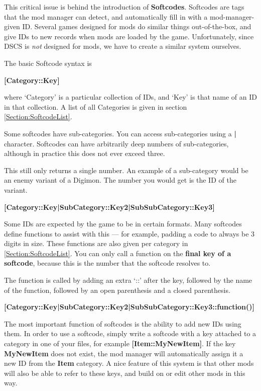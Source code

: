 \documentclass{article}
\begin{document}
This critical issue is behind the introduction of \textbf{Softcodes}. Softcodes are tags that the mod manager can detect, and automatically fill in with a mod-manager-given ID. Several games designed for mods do similar things out-of-the-box, and give IDs to new records when mods are loaded by the game. Unfortunately, since DSCS is \textit{not} designed for mods, we have to create a similar system ourselves.

The basic Softcode syntax is
\begin{center}\textbf{[Category::Key]}
\end{center}
where `Category' is a particular collection of IDs, and `Key' is that name of an ID in that collection. A list of all Categories is given in section \ref{Section:SoftcodeList}.

Some softcodes have sub-categories. You can access sub-categories using a \textbf{|} character. Softcodes can have arbitrarily deep numbers of sub-categories, although in practice this does not ever exceed three.

This still only returns a single number. An example of a sub-category would be an enemy variant of a Digimon. The number you would get is the ID of the variant.
\begin{center}
\textbf{[Category::Key|SubCategory::Key2|SubSubCategory::Key3]}
\end{center}

Some IDs are expected by the game to be in certain formats. Many softcodes define functions to assist with this --- for example, padding a code to always be 3 digits in size. These functions are also given per category in \ref{Section:SoftcodeList}. You can only call a function on the \textbf{final key of a softcode}, because this is the number that the softcode resolves to.

The function is called by adding an extra `::' after the key, followed by the name of the function, followed by an open parenthesis and a closed parenthesis.
\begin{center}
\textbf{[Category::Key|SubCategory::Key2|SubSubCategory::Key3::function()]}
\end{center}

The most important function of softcodes is the ability to add new IDs using them. In order to use a softcode, simply write a softcode with a key attached to a category in one of your files, for example \textbf{[Item::MyNewItem]}. If the key \textbf{MyNewItem} does not exist, the mod manager will automatically assign it a new ID from the \textbf{Item} category. A nice feature of this system is that other mods will also be able to refer to these keys, and build on or edit other mods in this way.
\end{document}
